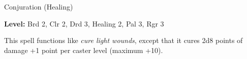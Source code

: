
Conjuration (Healing)

\textbf{Level:} Brd 2, Clr 2, Drd 3, Healing 2, Pal 3, Rgr 3

This spell functions like \textit{cure light wounds}, except that it cures 2d8 
points of damage +1 point per caster level (maximum +10).

